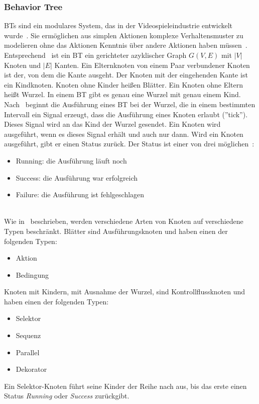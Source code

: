 \subsubsection{Behavior Tree}
\acp{BT} sind ein modulares System, das in der Videospieleindustrie entwickelt wurde~\cite{bt_book}.
Sie ermöglichen aus simplen Aktionen komplexe Verhaltensmuster zu modelieren ohne das Aktionen Kenntnis über andere Aktionen haben müssen~\cite{bt_robotics}.
Entsprechend~\cite{bt_1} ist ein \ac{BT} ein gerichteter azyklischer Graph $G(V,E)$ mit $|V|$ Knoten und $|E|$ Kanten.
Ein Elternknoten von einem Paar verbundener Knoten ist der, von dem die Kante ausgeht.
Der Knoten mit der eingehenden Kante ist ein Kindknoten.
Knoten ohne Kinder heißen Blätter.
Ein Knoten ohne Eltern heißt Wurzel.
In einem \ac{BT} gibt es genau eine Wurzel mit genau einem Kind.\\
Nach~\cite{bt_book} beginnt die Ausführung eines \ac{BT} bei der Wurzel, die in einem bestimmten Intervall ein Signal erzeugt, dass die Ausführung eines Knoten erlaubt (''tick'').
Dieses Signal wird an das Kind der Wurzel gesendet.
Ein Knoten wird ausgeführt, wenn es dieses Signal erhält und auch nur dann.
Wird ein Knoten ausgeführt, gibt er einen Status zurück.
Der Status ist einer von drei möglichen~\cite{bt_uav}:
\begin{itemize}
    \item Running: die Ausführung läuft noch
    \item Success: die Ausführung war erfolgreich
    \item Failure: die Ausführung ist fehlgeschlagen
\end{itemize}\\
Wie in~\cite{bt_1} beschrieben, werden verschiedene Arten von Knoten auf verschiedene Typen beschränkt.
Blätter sind Ausführungsknoten und haben einen der folgenden Typen:
\begin{itemize}
    \item Aktion
    \item Bedingung
\end{itemize}
Knoten mit Kindern, mit Ausnahme der Wurzel, sind Kontrollflussknoten und haben einen der folgenden Typen:
\begin{itemize}
    \item Selektor
    \item Sequenz
    \item Parallel
    \item Dekorator
\end{itemize}
Ein Selektor-Knoten führt seine Kinder der Reihe nach aus, bis das erste einen Status \emph{Running} oder \emph{Success} zurückgibt.
